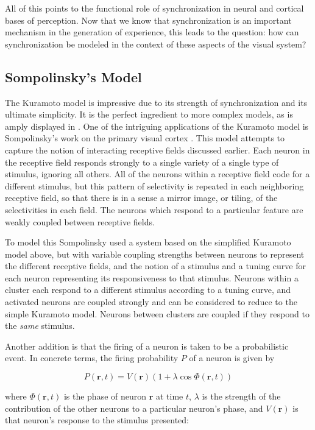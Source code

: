 \documentclass[12pt]{article}
\begin{document}
All of this points to the functional role of synchronization in neural and cortical bases of perception.  Now that we know that synchronization is an important mechanism in the generation of experience, this leads to the question: how can synchronization be modeled in the context of these aspects of the visual system?  

\subsection{Sompolinsky's Model}

The Kuramoto model is impressive due to its strength of synchronization and its ultimate simplicity.  It is the perfect ingredient to more complex models, as is amply displayed in \cite{Acebrón}.  One of the intriguing applications of the Kuramoto model is Sompolinsky's work on the primary visual cortex \cite{Sompolinsky}.  This model attempts to capture the notion of interacting receptive fields discussed earlier.  Each neuron in the receptive field responds strongly to a single variety of a single type of stimulus, ignoring all others.  All of the neurons within a receptive field code for a different stimulus, but this pattern of selectivity is repeated in each neighboring receptive field, so that there is in a sense a mirror image, or tiling, of the selectivities in each field.  The neurons which respond to a particular feature are weakly coupled between receptive fields.  

To model this Sompolinsky used a system based on the simplified Kuramoto model above, but with variable coupling strengths between neurons to represent the different receptive fields, and the notion of a stimulus and a tuning curve for each neuron representing its responsiveness to that stimulus.  Neurons within a cluster each respond to a different stimulus according to a tuning curve, and activated neurons are coupled strongly and can be considered to reduce to the simple Kuramoto model.  Neurons between clusters are coupled if they respond to the {\em same} stimulus.  

Another addition is that the firing of a neuron is taken to be a probabilistic event.  In concrete terms, the firing probability $P$ of a neuron is given by 

$$ P(\mathbf{r},t)=V(\mathbf{r})(1+\lambda\cos\Phi(\mathbf{r},t)) $$

where $\Phi(\mathbf{r},t)$ is the phase of neuron $\mathbf{r}$ at time $t$, $\lambda$ is the strength of the contribution of the other neurons to a particular neuron's phase, and $V(\mathbf{r})$ is that neuron's response to the stimulus presented:
\end{document}
